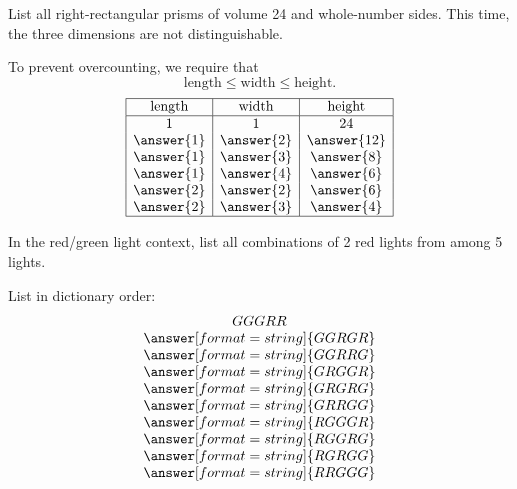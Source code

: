\documentclass[nooutcomes]{ximera}
\begin{document}
\newpage
\begin{problem}
List all right-rectangular prisms of volume 24 and whole-number sides.  This time, the three dimensions are not distinguishable. 

\begin{solution}
To prevent overcounting, we require that 
\[
\text{length} \le \text{width} \le \text{height}. 
\]
\[
\begin{array}{|c|c|c|}
\hline
\text{length} & \text{width} & \text{height} \\ 
\hline
1 & 1 & 24 \\
\answer{1} & \answer{2} & \answer{12} \\
\answer{1} & \answer{3} & \answer{8} \\
\answer{1} & \answer{4} & \answer{6} \\
\answer{2} & \answer{2} & \answer{6} \\
\answer{2} & \answer{3} & \answer{4} \\
\hline
\end{array}
\]
\end{solution}
\end{problem}


\newpage
\begin{problem}
In the red/green light context, list all combinations of 2 red lights from among 5 lights.    
\begin{solution}
List in dictionary order: 
\[
\begin{array}{c}
GGGRR \\
\answer[format=string]{GGRGR} \\
\answer[format=string]{GGRRG} \\
\answer[format=string]{GRGGR} \\
\answer[format=string]{GRGRG} \\
\answer[format=string]{GRRGG} \\
\answer[format=string]{RGGGR} \\
\answer[format=string]{RGGRG} \\
\answer[format=string]{RGRGG} \\
\answer[format=string]{RRGGG}
\end{array}
\]
\end{solution}
\end{problem}
\end{document}
